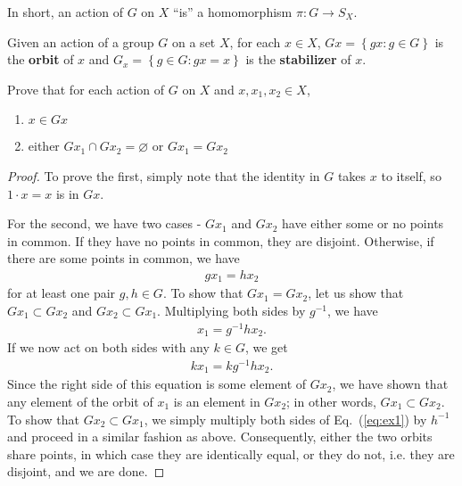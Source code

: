 \documentclass{../mathnotes}
\begin{document}
\begin{rem}
    In short, an action of $G$ on $X$ ``is'' a homomorphism $\pi: G\to S_X$.
\end{rem}

\begin{defn}
    Given an action of a group $G$ on a set $X$, for each $x\in X$, $Gx=\left\{ gx:g\in G \right\}$ is the \textbf{orbit} of $x$ and
    $G_x=\left\{ g\in G:gx=x \right\}$ is the \textbf{stabilizer} of $x$.
\end{defn}

\begin{exc}
    Prove that for each action of $G$ on $X$ and $x, x_1, x_2\in X$,
    \begin{enumerate}
        \item $x\in Gx$
        \item either $Gx_1\cap Gx_2=\varnothing$ or $Gx_1=Gx_2$
    \end{enumerate}
\end{exc}
\begin{proof}
    To prove the first, simply note that the identity in $G$ takes $x$ to itself, so $1\cdot x=x$ is in $Gx$.

    For the second, we have two cases - $Gx_1$ and $Gx_2$ have either some or no points in common. If they have no points in common, they are disjoint.
    Otherwise, if there are some points in common, we have
    \begin{align}
        gx_1=hx_2
        \label{eq:ex1}
    \end{align}
    for at least one pair $g,h\in G$. To show that $Gx_1=Gx_2$, let us show that $Gx_1\subset Gx_2$ and $Gx_2\subset Gx_1$. Multiplying both sides by $g^{-1}$, we have
    \begin{align*}
        x_1=g^{-1}hx_2.
    \end{align*}
    If we now act on both sides with any $k\in G$, we get
    \begin{align*}
        kx_1=kg^{-1}hx_2.
    \end{align*}
    Since the right side of this equation is some element of $Gx_2$, we have shown that any element of the orbit of $x_1$ is an element in $Gx_2$; in other words,
    $Gx_1\subset Gx_2$. To show that $Gx_2\subset Gx_1$, we simply multiply both sides of Eq.~(\ref{eq:ex1}) by $h^{-1}$ and proceed in a similar fashion as above.
    Consequently, either the two orbits share points, in which case they are identically equal, or they do not, i.e. they are disjoint, and we are done.
\end{proof}
\end{document}
